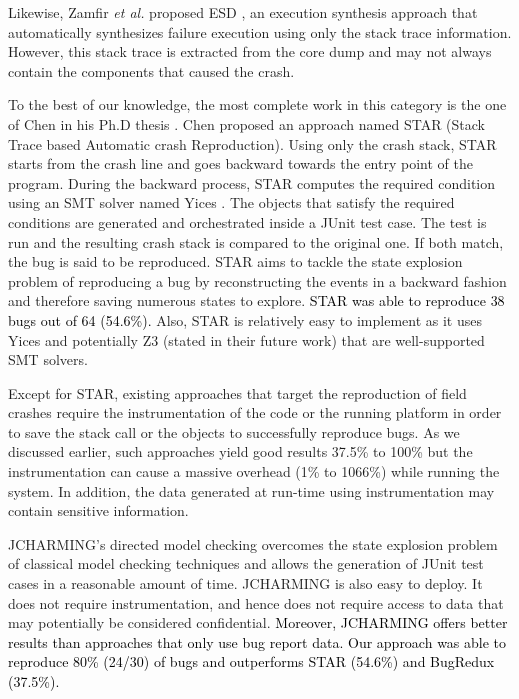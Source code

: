 \documentclass[times, doublespace]{smrauth}
\newcommand{\red}[1]{\textcolor{black}{#1}}
\begin{document}
Likewise, Zamfir {\it et al.} proposed ESD \cite{Zamfir2010}, an execution synthesis approach that automatically synthesizes failure execution using only the stack trace information. However, this stack trace is extracted from the core dump and may not always contain the components that caused the crash.

To the best of our knowledge, the most complete work in this category is the one of Chen in his Ph.D thesis \cite{Chen2013a}. Chen proposed an approach named STAR (Stack Trace based Automatic crash Reproduction). Using only the crash stack, STAR starts from the crash line and goes backward towards the entry point of the program. During the backward process, STAR computes the required condition using an SMT solver named Yices \cite{Dutertre2006}. The objects that satisfy the required conditions are generated and orchestrated inside a JUnit test case. The test is run and the resulting crash stack is compared to the original one. If both match, the bug is said to be reproduced. STAR aims to tackle the state explosion problem of reproducing a bug by reconstructing the events in a backward fashion and therefore saving numerous states to explore. \red{STAR was able to reproduce 38 bugs out of 64 (54.6\%).}
Also, STAR is relatively easy to implement as it uses Yices \cite{Dutertre2006} and potentially Z3 \cite{de2008z3} (stated in their future work) that are well-supported SMT solvers.

Except for STAR, existing approaches that target the reproduction of
field crashes require the instrumentation of the code or the running
platform in order to save the stack call or the objects to successfully
reproduce bugs. As we discussed earlier, such approaches yield good results 37.5\% to 100\% but the instrumentation can cause a massive
overhead (1\% to 1066\%) while running the system.
In addition, the data generated at run-time using instrumentation
may contain sensitive information.

JCHARMING's directed model checking overcomes the state explosion problem of
classical model checking techniques and allows the generation of
JUnit test cases in a reasonable amount of time.
JCHARMING is also easy to deploy. It does not require instrumentation,
and hence does not require access to data that may potentially
be considered confidential.
\red{Moreover, JCHARMING offers better results than approaches that only use bug report data.
Our approach was able to reproduce 80\% (24/30) of bugs and outperforms STAR (54.6\%) and BugRedux (37.5\%).}
\end{document}
